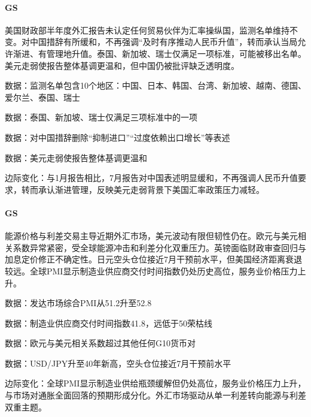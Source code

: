 \documentclass[11pt]{ctexart}
\begin{document}
\paragraph{GS} 美国财政部半年度外汇报告未认定任何贸易伙伴为汇率操纵国，监测名单维持不变。对中国措辞有所缓和，不再强调“及时有序推动人民币升值”，转而承认当局允许渐进、有管理地升值。泰国、新加坡、瑞士仅满足一项标准，可能被移出名单。美元走弱使报告整体基调更温和，但中国仍被批评缺乏透明度。
{\small\color{refgray}数据：监测名单包含10个地区：中国、日本、韩国、台湾、新加坡、越南、德国、爱尔兰、泰国、瑞士\par}
{\small\color{refgray}数据：泰国、新加坡、瑞士仅满足三项标准中的一项\par}
{\small\color{refgray}数据：对中国措辞删除“抑制进口”“过度依赖出口增长”等表述\par}
{\small\color{refgray}数据：美元走弱使报告整体基调更温和\par}
{\small\color{refgray}边际变化：与1月报告相比，7月报告对中国表述明显缓和，不再强调人民币升值要求，转而承认渐进管理，反映美元走弱背景下美国汇率政策压力减轻。\par}
\paragraph{GS} 能源价格与利差交易主导近期外汇市场，美元波动有限但韧性仍在。欧元与美元相关系数异常紧密，受全球能源冲击和利差分化双重压力。英镑面临财政审查回归与加息定价修正不确定性。日元空头仓位接近7月干预前水平，但美国经济距离衰退较远。全球PMI显示制造业供应商交付时间指数仍处历史高位，服务业价格压力上升。
{\small\color{refgray}数据：发达市场综合PMI从51.2升至52.8\par}
{\small\color{refgray}数据：制造业供应商交付时间指数41.8，远低于50荣枯线\par}
{\small\color{refgray}数据：欧元与美元相关系数超过其他任何G10货币对\par}
{\small\color{refgray}数据：USD/JPY升至40年新高，空头仓位接近7月干预前水平\par}
{\small\color{refgray}边际变化：全球PMI显示制造业供给瓶颈缓解但仍处高位，服务业价格压力上升，与市场对通胀全面回落的预期形成分化。外汇市场驱动从单一利差转向能源与利差双重主题。\par}
\end{document}
